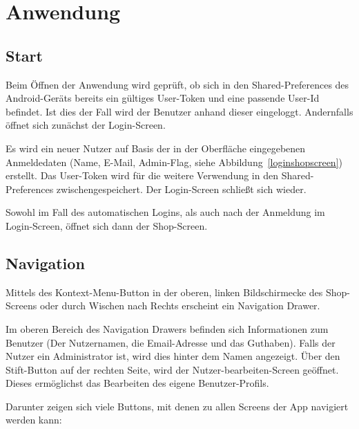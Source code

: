 \section{Anwendung}\label{sec:features}

\subsection{Start}\label{subsec:start}

Beim Öffnen der Anwendung wird geprüft, ob sich in den Shared-Preferences des Android-Geräts bereits ein gültiges User-Token und eine passende User-Id befindet.
Ist dies der Fall wird der Benutzer anhand dieser eingeloggt.
Andernfalls öffnet sich zunächst der Login-Screen.

Es wird ein neuer Nutzer auf Basis der in der Oberfläche eingegebenen Anmeldedaten (Name, E-Mail, Admin-Flag, siehe Abbildung~\ref{loginshopscreen}) erstellt.
Das User-Token wird für die weitere Verwendung in den Shared-Preferences zwischengespeichert.
Der Login-Screen schließt sich wieder.

Sowohl im Fall des automatischen Logins, als auch nach der Anmeldung im Login-Screen, öffnet sich dann der Shop-Screen.


\subsection{Navigation} \label{subsec:navigation}

Mittels des Kontext-Menu-Button in der oberen, linken Bildschirmecke des Shop-Screens oder durch Wischen nach Rechts erscheint ein Navigation Drawer.

Im oberen Bereich des Navigation Drawers befinden sich Informationen zum Benutzer (Der Nutzernamen, die Email-Adresse und das Guthaben).
Falls der Nutzer ein Administrator ist, wird dies hinter dem Namen angezeigt.
Über den Stift-Button auf der rechten Seite, wird der Nutzer-bearbeiten-Screen geöffnet.
Dieses ermöglichst das Bearbeiten des eigene Benutzer-Profils.

Darunter zeigen sich viele Buttons, mit denen zu allen Screens der App navigiert werden kann:

